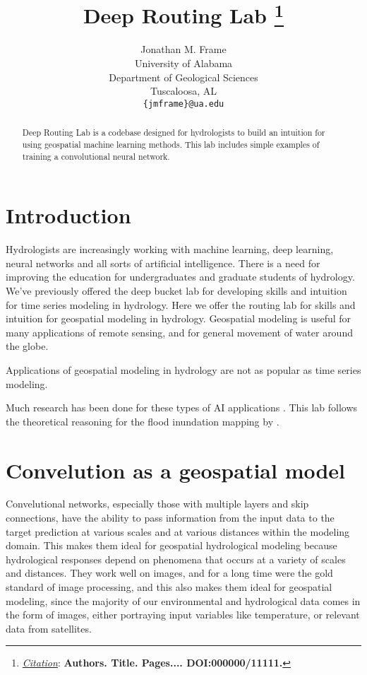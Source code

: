 \documentclass{article}
\title{Deep Routing Lab
\thanks{\textit{\underline{Citation}}: 
\textbf{Authors. Title. Pages.... DOI:000000/11111.}} 
}
\author{
  Jonathan M. Frame \\
  University of Alabama \\
  Department of Geological Sciences \\
  Tuscaloosa, AL\\
  \texttt{\{jmframe\}@ua.edu} \\
}
\begin{document}
\maketitle


\begin{abstract}
Deep Routing Lab is a codebase designed for hydrologists to build an intuition for using geospatial machine learning methods. This lab includes simple examples of training a convolutional neural network.
\end{abstract}




\section{Introduction}
Hydrologists are increasingly working with machine learning, deep learning, neural networks and all sorts of artificial intelligence. There is a need for improving the education for undergraduates and graduate students of hydrology. We've previously offered the deep bucket lab for developing skills and intuition for time series modeling in hydrology. Here we offer the routing lab for skills and intuition for geospatial modeling in hydrology. Geospatial modeling is useful for many applications of remote sensing, and for general movement of water around the globe. 

Applications of geospatial modeling in hydrology are not as popular as time series modeling. 

Much research has been done for these types of AI applications \cite{behroozi2025sensitivity}. This lab follows the theoretical reasoning for the flood inundation mapping by \cite{frame2024rapid}.

\section{Convelution as a geospatial model}
\label{sec:conv}
Convelutional networks, especially those with multiple layers and skip connections, have the ability to pass information from the input data to the target prediction at various scales and at various distances within the modeling domain. This makes them ideal for geospatial hydrological modeling because hydrological responses depend on phenomena that occurs at a variety of scales and distances. They work well on images, and for a long time were the gold standard of image processing, and this also makes them ideal for geospatial modeling, since the majority of our environmental and hydrological data comes in the form of images, either portraying input variables like temperature, or relevant data from satellites.
\end{document}
